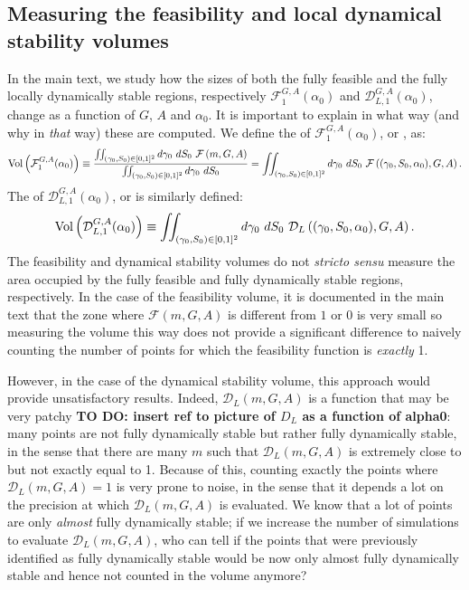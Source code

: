 \documentclass[12pt]{report}
\begin{document}
\subsection{Measuring the feasibility and local dynamical stability volumes}\label{app: how to measure volume}
In the main text, we study how the sizes of both the fully feasible and the fully locally dynamically stable regions, respectively $\mathcal{F}_1^{G,A}(\alpha_0)$ and $\mathcal{D}_{L,1}^{G,A}(\alpha_0)$, change as a function of $G$, $A$ and $\alpha_0$. It is important to explain in what way (and why in \textit{that} way) these are computed. We define the  of $\mathcal{F}^{G,A}_1(\alpha_0)$, or , as:
\begin{equation}
\vol{\mathcal{F}^{G,A}_1(\alpha_0)}\defined \frac{\iint_{(\gamma_0, S_0)\in[0,1]^2} d\gamma_0 \ dS_0 \ \mathcal{F}\left(m, G, A\right)}{\iint_{(\gamma_0, S_0)\in[0,1]^2} d\gamma_0 \ dS_0} = \iint_{(\gamma_0, S_0)\in[0,1]^2} d\gamma_0 \ dS_0 \ \mathcal{F}\left((\gamma_0, S_0, \alpha_0), G, A\right). \label{eq : app definition fully feasible volume of G, A}
\end{equation}
The  of $\mathcal{D}_{L,1}^{G,A}(\alpha_0)$, or  is similarly defined:
\begin{equation}
\vol{\mathcal{D}_{L,1}^{G,A}(\alpha_0)}\defined \iint_{(\gamma_0, S_0)\in[0,1]^2} d\gamma_0 \ dS_0 \ \mathcal{D}_L\left((\gamma_0, S_0, \alpha_0), G, A\right).
\end{equation}
The feasibility and dynamical stability volumes do not \textit{stricto sensu} measure the area occupied by the fully feasible and fully dynamically stable regions, respectively. In the case of the feasibility volume, it is documented in the main text that the zone where $\mathcal{F}(m, G,A)$ is different from $1$ or $0$ is very small so measuring the volume this way does not provide a significant difference to naively counting the number of points for which the feasibility function is \textit{exactly} 1.

However, in the case of the dynamical stability volume, this approach would provide unsatisfactory results. Indeed, $\mathcal{D}_{L}(m, G, A)$ is a function that may be very patchy \textbf{TO DO: insert ref to picture of $D_L$ as a function of alpha0}: many points are not fully dynamically stable but rather  fully dynamically stable, in the sense that there are many $m$ such that $\mathcal{D}_{L}(m, G, A)$ is extremely close to but not exactly equal to 1. Because of this, counting exactly the points where $\mathcal{D}_{L}(m, G, A)=1$ is very prone to noise, in the sense that it depends a lot on the precision at which $\mathcal{D}_L(m,G,A)$ is evaluated. We know that a lot of points are only \textit{almost} fully dynamically stable; if we increase the number of simulations to evaluate $\mathcal{D}_{L}(m, G, A)$, who can tell if the points that were previously identified as fully dynamically stable would be now only almost fully dynamically stable and hence not counted in the volume anymore?
\end{document}
